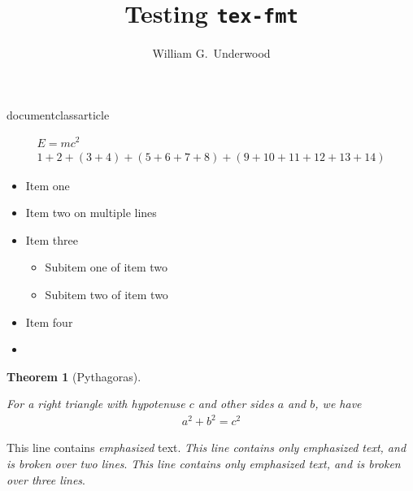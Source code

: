 documentclass{article}

\usepackage{amsmath}
\usepackage{amsthm}

\newtheorem{theorem}{Theorem}

\title{Testing \texttt{tex-fmt}}
\author{William G.\ Underwood}

\maketitle

\begin{align}
E = m c^2 \\
1 + 2
+ (3 + 4)
+ (5 + 6
+ 7 + 8)
+ (9 + 10
+ 11 + 12
+ 13 + 14)
\end{align}

\begin{itemize}
\item Item one %
\item Item two on
multiple lines
\item Item three
\begin{itemize}
\item Subitem one of item two
\item Subitem two of item two
\end{itemize}
\item Item four %
\item
\end{itemize}

\begin{theorem}[Pythagoras]%
\label{thm:pythagoras}

For a right triangle with hypotenuse $c$ and other sides $a$ and $b$,
we have
%
\begin{align*}
a^2 + b^2 = c^2
\end{align*}
%

\end{theorem}

This line contains \emph{emphasized} text.
\emph{This line contains only emphasized text,
and is broken over two lines}.
\emph{This line contains only
emphasized text,
and is broken over three lines}.


